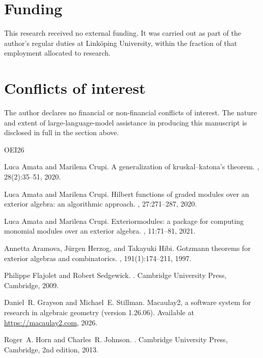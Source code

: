 \documentclass[11pt, a4paper, abstract=yes]{scrartcl}
\theoremstyle{definition}
\theoremstyle{remark}
\theoremstyle{plain}
\begin{document}
\section*{Funding}
\label{sec:orgd0454cd}
This research received no external funding. It was carried out as part of the author's regular duties
at Linköping University, within the fraction of that employment allocated to research.
\section*{Conflicts of interest}
\label{sec:org079fc58}
The author declares no financial or non-financial conflicts of interest. The nature and extent of
large-language-model assistance in producing this manuscript is disclosed in full in the section
above.
\begin{thebibliography}{{OEI}26}

Luca Amata and Marilena Crupi.
\newblock A generalization of kruskal--katona's theorem.
, 28(2):35--51, 2020.

Luca Amata and Marilena Crupi.
\newblock Hilbert functions of graded modules over an exterior algebra: an
  algorithmic approach.
, 27:271--287, 2020.

Luca Amata and Marilena Crupi.
\newblock Exteriormodules: a package for computing monomial modules over an
  exterior algebra.
, 11:71--81, 2021.

Annetta Aramova, J{\"u}rgen Herzog, and Takayuki Hibi.
\newblock Gotzmann theorems for exterior algebras and combinatorics.
, 191(1):174--211, 1997.

Philippe Flajolet and Robert Sedgewick.
.
\newblock Cambridge University Press, Cambridge, 2009.

Daniel~R. Grayson and Michael~E. Stillman.
\newblock Macaulay2, a software system for research in algebraic geometry
  (version 1.26.06).
\newblock Available at \url{https://macaulay2.com}, 2026.

Roger~A. Horn and Charles~R. Johnson.
.
\newblock Cambridge University Press, Cambridge, 2nd edition, 2013.


\end{thebibliography}
\end{document}
